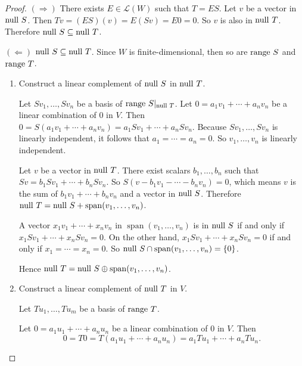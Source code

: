 \begin{proof}
    $(\Rightarrow)$ There exists $E\in\mathcal{L}(W)$ such that $T = ES$. Let $v$ be a vector in $\operatorname{null}\,{S}$. Then $Tv = (ES)(v) = E(Sv) = E0 = 0$. So $v$ is also in $\operatorname{null}\,{T}$. Therefore $\operatorname{null}\,{S}\subseteq\operatorname{null}\,{T}$.

    $(\Leftarrow)$ $\operatorname{null}\,{S}\subseteq\operatorname{null}\,{T}$. Since $W$ is finite-dimensional, then so are $\operatorname{range}\,{S}$ and $\operatorname{range}\,{T}$.

    \begin{enumerate}[label={\textbf{Step \arabic*.}},itemindent={1cm}]
        \item Construct a linear complement of $\operatorname{null}\,{S}$ in $\operatorname{null}\,{T}$.

              Let $Sv_{1}, \ldots, Sv_{n}$ be a basis of $\operatorname{range}\,{S}\vert_{\operatorname{null}\,{T}}$. Let $0 = a_{1}v_{1} + \cdots + a_{n}v_{n}$ be a linear combination of $0$ in $V$. Then $0 = S(a_{1}v_{1} + \cdots + a_{n}v_{n}) = a_{1}Sv_{1} + \cdots + a_{n}Sv_{n}$. Because $Sv_{1}, \ldots, Sv_{n}$ is linearly independent, it follows that $a_{1} = \cdots = a_{n} = 0$. So $v_{1}, \ldots, v_{n}$ is linearly independent.

              Let $v$ be a vector in $\operatorname{null}\,{T}$. There exist scalars $b_{1}, \ldots, b_{n}$ such that $Sv = b_{1}Sv_{1} + \cdots + b_{n}Sv_{n}$. So $S(v - b_{1}v_{1} - \cdots - b_{n}v_{n}) = 0$, which means $v$ is the sum of $b_{1}v_{1} + \cdots + b_{n}v_{n}$ and a vector in $\operatorname{null}\,{S}$. Therefore $\operatorname{null}\,{T} = \operatorname{null}\,{S} + \operatorname{span}(v_{1}, \ldots, v_{n})$.

              A vector $x_{1}v_{1} + \cdots + x_{n}v_{n}$ in $\operatorname{span}(v_{1}, \ldots, v_{n})$ is in $\operatorname{null}\,{S}$ if and only if $x_{1}Sv_{1} + \cdots + x_{n}Sv_{n} = 0$. On the other hand, $x_{1}Sv_{1} + \cdots + x_{n}Sv_{n} = 0$ if and only if $x_{1} = \cdots = x_{n} = 0$. So $\operatorname{null}\,{S}\cap \operatorname{span}(v_{1}, \ldots, v_{n}) = \{0\}$.

              Hence $\operatorname{null}\,{T} = \operatorname{null}\,{S}\oplus\operatorname{span}(v_{1}, \ldots, v_{n})$.
        \item Construct a linear complement of $\operatorname{null}\,{T}$ in $V$.

              Let $Tu_{1}, \ldots, Tu_{m}$ be a basis of $\operatorname{range}\,{T}$.

              Let $0 = a_{1}u_{1} + \cdots + a_{n}u_{n}$ be a linear combination of $0$ in $V$. Then
              \[
                  0 = T0 = T(a_{1}u_{1} + \cdots + a_{n}u_{n}) = a_{1}Tu_{1} + \cdots + a_{n}Tu_{n}.
              \]


\end{enumerate}
\end{proof}
